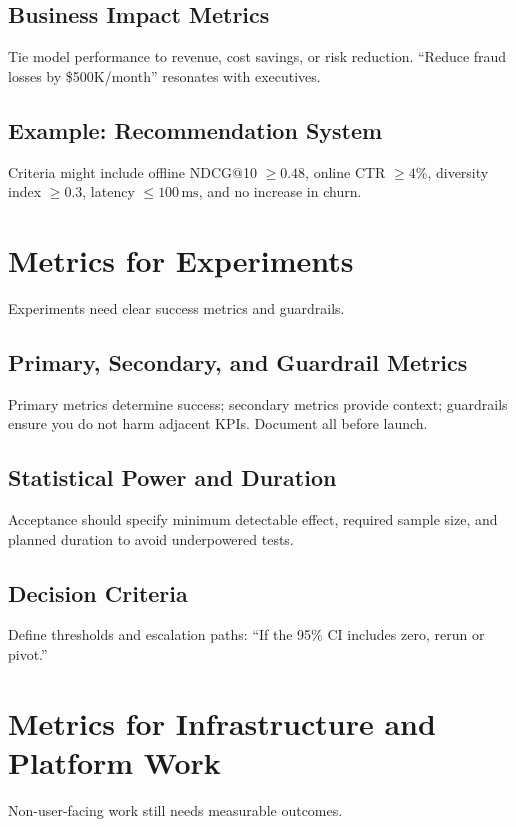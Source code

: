 \subsection{Business Impact Metrics}
Tie model performance to revenue, cost savings, or risk reduction. ``Reduce fraud losses by \$500K/month'' resonates with executives.

\subsection{Example: Recommendation System}
Criteria might include offline NDCG@10 $\ge 0.48$, online CTR $\ge 4\%$, diversity index $\ge 0.3$, latency $\le 100\,\text{ms}$, and no increase in churn.

\section{Metrics for Experiments}
\label{sec:experiment-metrics}

Experiments need clear success metrics and guardrails.

\subsection{Primary, Secondary, and Guardrail Metrics}
Primary metrics determine success; secondary metrics provide context; guardrails ensure you do not harm adjacent KPIs. Document all before launch.

\subsection{Statistical Power and Duration}
Acceptance should specify minimum detectable effect, required sample size, and planned duration to avoid underpowered tests.

\subsection{Decision Criteria}
Define thresholds and escalation paths: ``If the 95\% CI includes zero, rerun or pivot.''

\section{Metrics for Infrastructure and Platform Work}
\label{sec:infra-metrics}

Non-user-facing work still needs measurable outcomes.

